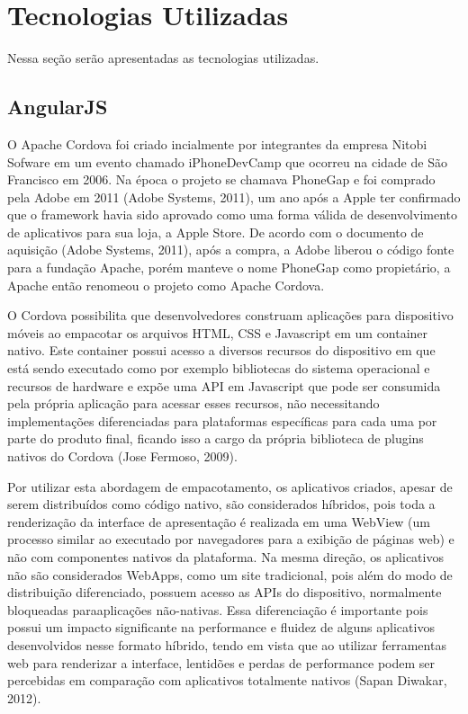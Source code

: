 \section{\esp Tecnologias Utilizadas}
Nessa seção serão apresentadas as tecnologias utilizadas.

\subsection{\esp AngularJS}
O Apache Cordova foi criado incialmente por integrantes da empresa Nitobi Sofware em um evento chamado iPhoneDevCamp que ocorreu na cidade de São Francisco em 2006. Na época o projeto se chamava PhoneGap e foi comprado pela Adobe em 2011 (Adobe Systems, 2011), um ano após a Apple ter confirmado que o framework havia sido aprovado como uma forma válida de desenvolvimento de aplicativos para sua loja, a Apple Store. De acordo com o documento de aquisição (Adobe Systems, 2011), após a compra, a Adobe liberou o código fonte para a fundação Apache, porém manteve o nome PhoneGap como propietário, a Apache então renomeou o projeto como Apache Cordova.

O Cordova possibilita que desenvolvedores construam aplicações para dispositivo móveis ao empacotar os arquivos HTML, CSS e Javascript em um container nativo. Este container possui acesso a diversos recursos do dispositivo em que está sendo executado como por exemplo bibliotecas do sistema operacional e recursos de hardware e expõe uma API em Javascript que pode ser consumida pela própria aplicação para acessar esses recursos, não necessitando implementações diferenciadas para plataformas específicas para cada uma por parte do produto final, ficando isso a cargo da própria biblioteca de plugins nativos do Cordova (Jose Fermoso, 2009).

Por utilizar esta abordagem de empacotamento, os aplicativos criados, apesar de serem distribuídos como código nativo, são considerados híbridos, pois toda a renderização da interface de apresentação é realizada em uma WebView (um processo similar ao executado por navegadores para a exibição de páginas web) e não com componentes nativos da plataforma. Na mesma direção, os aplicativos não são considerados WebApps, como um site tradicional, pois além do modo de distribuição diferenciado, possuem acesso as APIs do dispositivo, normalmente bloqueadas paraaplicações não-nativas. Essa diferenciação é importante pois possui um impacto significante na performance e fluidez de alguns aplicativos desenvolvidos nesse formato híbrido, tendo em vista que ao utilizar ferramentas web para renderizar a interface, lentidões e perdas de performance podem ser percebidas em comparação com aplicativos totalmente nativos (Sapan Diwakar, 2012).

